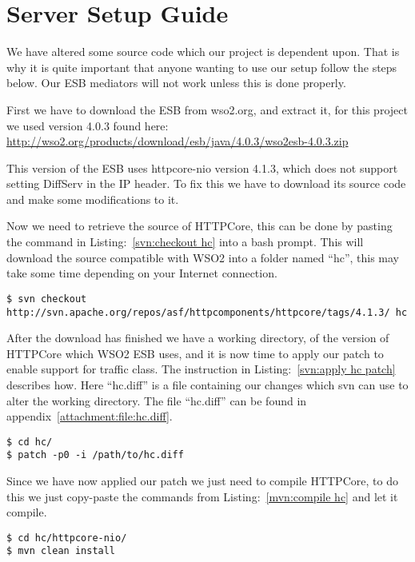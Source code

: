\section{Server Setup Guide}\label{Server Setup Guide}
	\begin{shaded}
	We have altered some source code which our project is dependent upon. That is why it is quite important that anyone wanting to use our setup follow the steps below. Our ESB mediators will not work unless this is done properly.
	\end{shaded}

	First we have to download the ESB from wso2.org, and extract it, for this project we used version 4.0.3 found here:
\url{http://wso2.org/products/download/esb/java/4.0.3/wso2esb-4.0.3.zip}

	This version of the ESB uses httpcore-nio version 4.1.3, which does not support setting DiffServ in the IP header. To fix this we have to download its source code and make some modifications to it.

	Now we need to retrieve the source of HTTPCore, this can be done by pasting the command in Listing:~\ref{svn:checkout hc} into a bash prompt. This will download the source compatible with WSO2 into a folder named “hc”, this may take some time depending on your Internet connection.
\lstset{language=bash, style=shell}
\begin{lstlisting}[frame=single, caption={Checkout HttpCore source}, label=svn:checkout hc, breaklines=true]
$ svn checkout http://svn.apache.org/repos/asf/httpcomponents/httpcore/tags/4.1.3/ hc
\end{lstlisting}

	After the download has finished we have a working directory, of the version of HTTPCore which WSO2 ESB uses, and it is now time to apply our patch to enable support for traffic class. The instruction in Listing:~\ref{svn:apply hc patch} describes how. Here “hc.diff” is a file containing our changes which svn can use to alter the working directory. The file “hc.diff” can be found in appendix~\ref{attachment:file:hc.diff}.
\begin{lstlisting}[frame=single, caption={Apply HC patch}, label=svn:apply hc patch]
$ cd hc/
$ patch -p0 -i /path/to/hc.diff
\end{lstlisting}

	Since we have now applied our patch we just need to compile HTTPCore, to do this we just copy-paste the commands from Listing:~\ref{mvn:compile hc} and let it compile.
\begin{lstlisting}[frame=single, caption={Build HttpCore-NIO}, label=mvn:compile hc, breaklines=true]
$ cd hc/httpcore-nio/
$ mvn clean install
\end{lstlisting}

